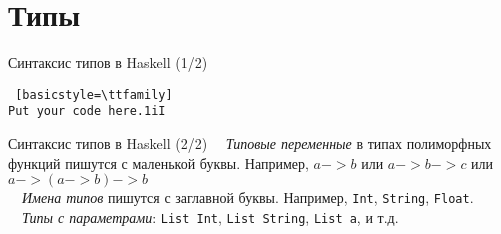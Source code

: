 \documentclass{beamer}
\begin{document}
\section{Типы}

\begin{frame}[fragile]{Синтаксис типов в Haskell (1/2)}
\begin{lstlisting} [basicstyle=\ttfamily]
Put your code here.1iI
\end{lstlisting}

\end{frame}

\begin{frame}{Синтаксис типов в Haskell (2/2)}
~\ \emph{Типовые переменные} в типах полиморфных функций пишутся с маленькой буквы. Например, $a -> b$ или $a -> b -> c$ или $a -> (a -> b) -> b$ 
\\ \pause
~\ \emph{Имена типов} пишутся с заглавной буквы. Например,  \lstinline=Int=, \lstinline=String=, \lstinline=Float=.
\\ \pause
~\ \emph{Типы с параметрами}: \lstinline=List Int=, \lstinline=List String=, \lstinline=List a=, и т.д. 
\end{frame}



\end{document}
